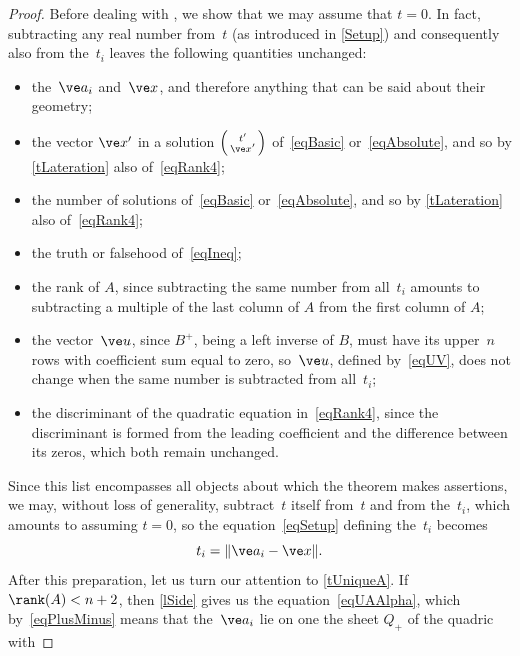 \documentclass[reqno]{amsart}
\begin{document}
\begin{proof}
  Before dealing with , we show that we
  may assume that $t = 0$. In fact, subtracting any real number
  from~$t$ (as introduced in \cref{Setup}) and consequently also from
  the~$t_i$ leaves the following quantities unchanged:
  \begin{itemize}
  \item the~$\ve a_i$ and~$\ve x$, and therefore anything that can be
    said about their geometry;
  \item the vector $\ve x'$ in a solution
    $\left(\begin{smallmatrix} t' \\ \ve x'\end{smallmatrix}\right)$
    of~\eqref{eqBasic} or~\eqref{eqAbsolute}, and so by
    \cref{tLateration} also of~\eqref{eqRank4};
  \item the number of solutions of~\eqref{eqBasic}
    or~\eqref{eqAbsolute}, and so by \cref{tLateration} also
    of~\eqref{eqRank4};
  \item the truth or falsehood of~\eqref{eqIneq};
  \item the rank of $A$, since subtracting the same number from
    all~$t_i$ amounts to subtracting a multiple of the last column of
    $A$ from the first column of $A$;
  \item the vector~$\ve u$, since $B^+$, being a left inverse of $B$,
    must have its upper~$n$ rows with coefficient sum equal to zero,
    so~$\ve u$, defined by~\eqref{eqUV}, does not change when the same
    number is subtracted from all~$t_i$;
  \item the discriminant of the quadratic equation in~\eqref{eqRank4},
    since the discriminant is formed from the leading coefficient and
    the difference between its zeros, which both remain unchanged.
  \end{itemize}
  Since this list encompasses all objects about which the theorem
  makes assertions, we may, without loss of generality, subtract~$t$
  itself from~$t$ and from the~$t_i$, which amounts to assuming
  $t = 0$, so the equation~\eqref{eqSetup} defining the~$t_i$ becomes
  \begin{equation} \label{eqTi}%
    t_i = \lVert\ve a_i - \ve x\rVert.
  \end{equation}
  After this preparation, let us turn our attention to
  \cref{tUniqueA}. If $\rank(A) < n + 2$, then \cref{lSide} gives us
  the equation~\eqref{eqUAAlpha}, which by~\eqref{eqPlusMinus} means
  that the~$\ve a_i$ lie on one the sheet $Q_+$ of the quadric with

\end{proof}
\end{document}
